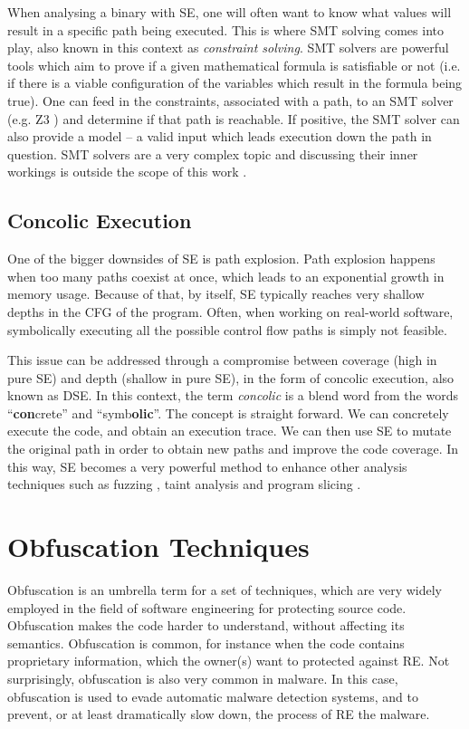 When analysing a binary with \gls{SE}, one will often want to know what values will result in a specific path being executed. This is where \gls{SMT} \cite{smt} solving comes into play, also known in this context as \emph{constraint solving}. \gls{SMT} solvers are powerful tools which aim to prove if a given mathematical formula is satisfiable or not (i.e. if there is a viable configuration of the variables which result in the formula being true). One can feed in the constraints, associated with a path, to an \gls{SMT} solver (e.g. Z3 \cite{z3}) and determine if that path is reachable. If positive, the \gls{SMT} solver can also provide a model -- a valid input which leads execution down the path in question. \gls{SMT} solvers are a very complex topic and discussing their inner workings is outside the scope of this work \cite{all_about_taint_2010}. 

\subsection{Concolic Execution}

One of the bigger downsides of \gls{SE} is path explosion. Path explosion happens when too many paths coexist at once, which leads to an exponential growth in memory usage. Because of that, by itself, \gls{SE} typically reaches very shallow depths in the \gls{CFG} of the program. Often, when working on real-world software, symbolically executing all the possible control flow paths is simply not feasible.

This issue can be addressed through a compromise between coverage (high in pure \gls{SE}) and depth (shallow in pure \gls{SE}), in the form of concolic execution, also known as \gls{DSE}. In this context, the term \emph{concolic} is a blend word from the words ``\textbf{con}crete'' and ``symb\textbf{olic}''. The concept is straight forward. We can concretely execute the code, and obtain an execution trace. We can then use \gls{SE} to mutate the original path in order to obtain new paths and improve the code coverage. In this way, \gls{SE} becomes a very powerful method to enhance other analysis techniques such as fuzzing \cite{fuzzing}, taint analysis and program slicing \cite{survey_symbolic_2018}.

\section{Obfuscation Techniques}
\label{sec:obfuscation}

Obfuscation is an umbrella term for a set of techniques, which are very widely employed in the field of software engineering for protecting source code. Obfuscation makes the code harder to understand, without affecting its semantics. Obfuscation is common, for instance when the code contains proprietary information, which the owner(s) want to protected against \gls{RE}. Not surprisingly, obfuscation is also very common in malware. In this case, obfuscation is used to evade automatic malware detection systems, and to prevent, or at least dramatically slow down, the process of \gls{RE} the malware.

